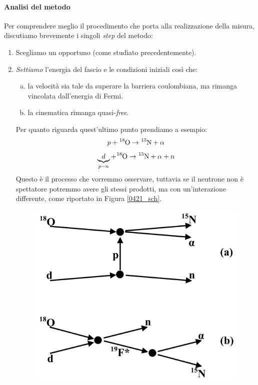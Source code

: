 \paragraph{Analisi del metodo} Per comprendere meglio il procedimento che porta alla realizzazione della misura, discutiamo brevemente i singoli \textit{step} del metodo:
\begin{enumerate}
	\item Scegliamo un opportuno  (come studiato precedentemente).
	\item \textit{Settiamo} l'energia del fascio e le condizioni iniziali così che:
	\begin{enumerate}[(a)]
		\item la velocità sia tale da superare la barriera coulombiana, ma rimanga vincolata dall'energia di Fermi.
		\item la cinematica rimanga quasi-\textit{free}.
	\end{enumerate}
	\noindent Per quanto riguarda quest'ultimo punto prendiamo a esempio:
	$$p + \ce{^{18}O} \to \ce{^{15}N} + \alpha $$
	$$\underbrace{d}_{p-n} + \ce{^{18}O} \to \ce{^{15}N} + \alpha + n$$
	Questo è il processo che vorremmo osservare, tuttavia se il neutrone non è spettatore potremmo avere gli stessi prodotti, ma con un'interazione differente, come riportato in Figura \ref{0421_sch}. 
	\begin{figure}[!h]
		\centering
		\includegraphics[scale=0.5]{Immagini/0421_sch-cut1.png}

\end{figure}
\end{enumerate}
